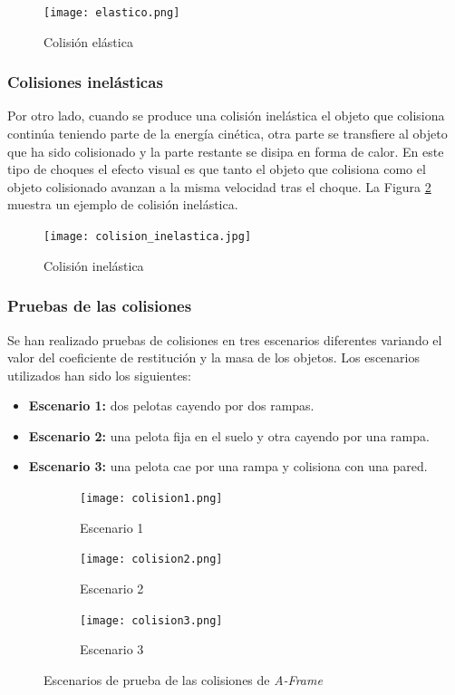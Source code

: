 \begin{figure}[h!]
    \centering
    \texttt{[image: elastico.png]}
    \caption{Colisión elástica\footnotemark}
    \label{fig:elastico}
\end{figure}


\subsubsection{Colisiones inelásticas}
Por otro lado, cuando se produce una colisión inelástica el objeto que colisiona continúa teniendo parte de la energía cinética, otra parte se transfiere al objeto que ha sido colisionado y la parte restante se disipa en forma de calor. En este tipo de choques el efecto visual es que tanto el objeto que colisiona como el objeto colisionado avanzan a la misma velocidad tras el choque. La Figura \ref{fig:inelastico} muestra un ejemplo de colisión inelástica.

\begin{figure}[h!]
    \centering
    \texttt{[image: colision\_inelastica.jpg]}
    \caption{Colisión inelástica\footnotemark}
    \label{fig:inelastico}
\end{figure}

\subsubsection{Pruebas de las colisiones}
Se han realizado pruebas de colisiones en tres escenarios diferentes variando el valor del coeficiente de restitución y la masa de los objetos. Los escenarios utilizados han sido los siguientes:

\begin{itemize}
    \item \textbf{Escenario 1:} dos pelotas cayendo por dos rampas.
    \item \textbf{Escenario 2:} una pelota fija en el suelo y otra cayendo por una rampa.
    \item \textbf{Escenario 3:} una pelota cae por una rampa y colisiona con una pared.
\end{itemize}

\begin{figure}[!h]
  \begin{subfigure}[b]{0.3\textwidth}
    \texttt{[image: colision1.png]}
    \caption{Escenario 1}
  \end{subfigure}
  \hfill
  \begin{subfigure}[b]{0.3\textwidth}
    \texttt{[image: colision2.png]}
    \caption{Escenario 2}
  \end{subfigure}
    \hfill
  \begin{subfigure}[b]{0.3\textwidth}
    \texttt{[image: colision3.png]}
    \caption{Escenario 3}
  \end{subfigure}
  \caption{Escenarios de prueba de las colisiones de \textit{A-Frame}}
 \end{figure}

